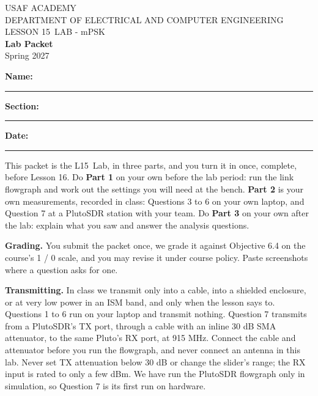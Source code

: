 \documentclass{exam}
\def\labLesson{15}
\def\thisterm{\thisTermIn}
\def\thisterm{Spring 2027}
\begin{document}
\pagestyle{headandfoot}   %


\begin{center}
USAF ACADEMY \\
DEPARTMENT OF ELECTRICAL AND COMPUTER ENGINEERING \\
LESSON \labLesson\ LAB - mPSK \\
\textbf{Lab Packet} \\
\thisterm \\[4mm]
\end{center}

\vspace{-4pt}
\textbf{Name:} \rule[-2pt]{2.6in}{0.4pt} \hfill
\textbf{Section:} \rule[-2pt]{0.9in}{0.4pt} \hfill
\textbf{Date:} \rule[-2pt]{1.1in}{0.4pt}

\vspace{4pt}


\vspace{2pt}

This packet is the L\labLesson\ Lab, in three parts, and you turn it in once, complete,
before Lesson 16. Do \textbf{Part 1} on your own before the lab period: run the link
flowgraph and work out the settings you will need at the bench. \textbf{Part 2} is
your own measurements, recorded in class: Questions 3 to 6 on your own laptop, and
Question 7 at a PlutoSDR station with your team. Do \textbf{Part 3} on your own after
the lab: explain what you saw and answer the analysis questions.

\textbf{Grading.} You submit the packet once, we grade it against Objective 6.4 on
the course's 1 / 0 scale, and you may revise it under course policy. Paste screenshots
where a question asks for one.

\textbf{Transmitting.} In class we transmit only into a cable, into a shielded
enclosure, or at very low power in an ISM band, and only when the lesson says to.
Questions 1 to 6 run on your laptop and transmit nothing. Question 7 transmits from a
PlutoSDR's TX port, through a cable with an inline 30 dB SMA attenuator, to the same
Pluto's RX port, at 915 MHz. Connect the cable and attenuator before you run the
flowgraph, and never connect an antenna in this lab. Never set TX attenuation below
30 dB or change the slider's range; the RX input is rated to only a few dBm. We have
run the PlutoSDR flowgraph only in simulation, so Question 7 is its first run on
hardware.
\end{document}
